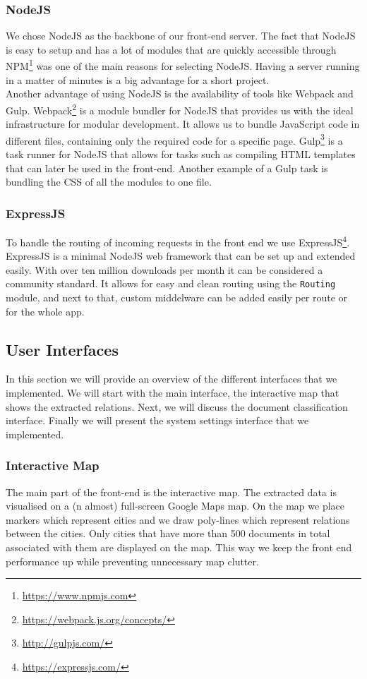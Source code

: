 \subsubsection{NodeJS}
We chose NodeJS as the backbone of our front-end server. The fact that NodeJS is easy to setup and has a lot of modules that are quickly accessible through NPM\footnote{\url{https://www.npmjs.com}} was one of the main reasons for selecting NodeJS. Having a server running in a matter of minutes is a big advantage for a short project.\\
Another advantage of using NodeJS is the availability of tools like Webpack and Gulp. Webpack\footnote{\url{https://webpack.js.org/concepts/}} is a module bundler for NodeJS that provides us with the ideal infrastructure for modular development. It allows us to bundle JavaScript code in different files, containing only the required code for a specific page. Gulp\footnote{\url{http://gulpjs.com/}} is a task runner for NodeJS that allows for tasks such as compiling HTML templates that can later be used in the front-end. Another example of a Gulp task is bundling the CSS of all the modules to one file.

\subsubsection{ExpressJS}

To handle the routing of incoming requests in the front end we use ExpressJS\footnote{\url{https://expressjs.com/}}. ExpressJS is a minimal NodeJS web framework that can be set up and extended easily. With over ten million downloads per month it can be considered a community standard. It allows for easy and clean routing using the \texttt{Routing} module, and next to that, custom middelware can be added easily per route or for the whole app.

\subsection{User Interfaces}
In this section we will provide an overview of the different interfaces that we implemented. We will start with the main interface, the interactive map that shows the extracted relations. Next, we will discuss the document classification interface. Finally we will present the system settings interface that we implemented.

\subsubsection{Interactive Map}
The main part of the front-end is the interactive map. The extracted data is visualised on a (n almost) full-screen Google Maps map. On the map we place markers which represent cities and we draw poly-lines which represent relations between the cities. Only cities that have more than 500 documents in total associated with them are displayed on the map. This way we keep the front end performance up while preventing unnecessary map clutter.

